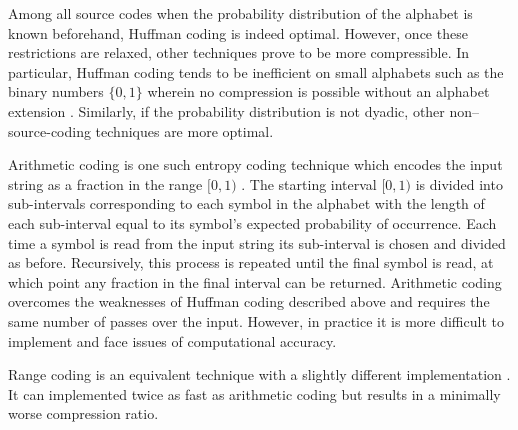 Among all source codes when the probability distribution of the alphabet is known beforehand, Huffman coding is indeed optimal. However, once these restrictions are relaxed, other techniques prove to be more compressible. In particular, Huffman coding tends to be inefficient on small alphabets such as the binary numbers $\{0,1\}$ wherein no compression is possible without an alphabet extension \cite{arithmetic-coding}. Similarly, if the probability distribution is not dyadic, other non--source-coding techniques are more optimal.

Arithmetic coding is one such entropy coding technique which encodes the input string as a fraction in the range $[0,1)$ \cite{arithmetic-coding}. The starting interval $[0,1)$ is divided into sub-intervals corresponding to each symbol in the alphabet with the length of each sub-interval equal to its symbol's expected probability of occurrence. Each time a symbol is read from the input string its sub-interval is chosen and divided as before. Recursively, this process is repeated until the final symbol is read, at which point any fraction in the final interval can be returned. Arithmetic coding overcomes the weaknesses of Huffman coding described above and requires the same number of passes over the input. However, in practice it is more difficult to implement and face issues of computational accuracy.

Range coding is an equivalent technique with a slightly different implementation
\cite{range-coding}. It can implemented twice as fast as arithmetic coding but
results in a minimally worse compression ratio.

